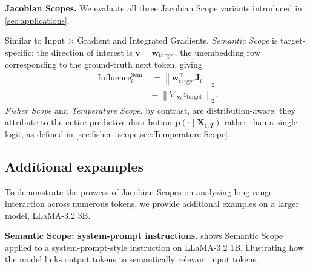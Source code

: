 \documentclass{article}
\begin{document}
\noindent\textbf{Jacobian Scopes.}
We evaluate all three Jacobian Scope variants introduced in \cref{sec:applications}.

Similar to Input $\times$ Gradient and Integrated Gradients, \emph{Semantic Scope} is target-specific: the direction of interest is $\bm{v} = \bm{w}_\mathrm{target}$, the unembedding row corresponding to the ground-truth next token, giving
\begin{equation}
\begin{aligned}
    \mathrm{Influence}_t^{\mathrm{Sem}} &:= \left\|\bm{w}_\mathrm{target}^\intercal \bm{J}_t\right\|_{2} \\
    &= \left\|\nabla_{\bm{x}_t} z_\mathrm{target}\right\|_{2}.
\end{aligned}
\end{equation}
\emph{Fisher Scope} and \emph{Temperature Scope}, by contrast, are distribution-aware: they attribute to the entire predictive distribution $\bm{p}(\cdot\mid\bm{X}_{1:T})$ rather than a single logit, as defined in \cref{sec:fisher_scope,sec:Temperature Scope}.





\subsection{Additional expamples} \label{sec: additional experiments}
To demonstrate the prowess of Jacobian Scopes on analyzing long-range 
interaction across numerous tokens, we provide additional examples on a larger model, LLaMA-3.2 3B.

\vspace{1em}
\noindent\textbf{Semantic Scope: system-prompt instructions.}
 shows Semantic Scope applied to a system-prompt-style instruction on LLaMA-3.2 1B, illustrating how the model links output tokens to semantically relevant input tokens.
\end{document}
